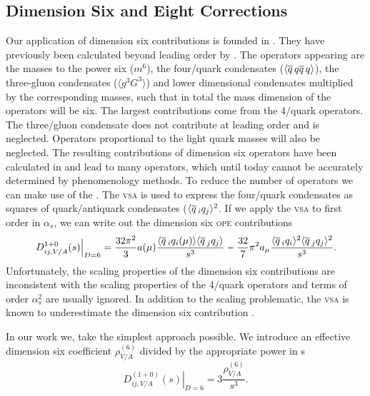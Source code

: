 \documentclass[../../index.tex]{subfiles}
\begin{document}
\subsection{Dimension Six and Eight Corrections}
Our application of dimension six contributions is founded in \cite{Braaten1991}.
They have previously been calculated beyond leading order by \cite{Lanin1986}.
The operators appearing are the masses to the power six (\(m^6\)), the
four\-/quark condensates (\(\langle \overline{q}\, q \overline{q}\, q \rangle\)), the
three-gluon condensates (\(\langle g^3 G^3 \rangle\)) and lower dimensional
condensates multiplied by the corresponding masses, such that in total the mass
dimension of the operators will be six. The largest contributions come from the
4\-/quark operators. The three\-/gluon condensate does not contribute at leading
order \cite{Hubschmid1982} and is neglected. Operators proportional to the light
quark masses will also be neglected. The resulting contributions of dimension
six operators have been calculated in \cite{Lanin1986} and lead to many
operators, which until today cannot be accurately determined by phenomenology
methods. To reduce the number of operators we can make use of the
\cite{Beneke2008,Braaten1991,Shifman1978}. The \textsc{vsa} is used to express
the four\-/quark condensates as squares of quark\-/antiquark condensates
(\(\langle \overline{q}\,_i q_j \rangle^2\). If we apply the \textsc{vsa} to first order
in \(\alpha_s\), we can write out the dimension six \textsc{ope} contributions
\begin{equation}
  \left. D_{ij,V/A}^{1+0}(s) \right\vert_{D=6} = \frac{32\pi^2}{3} a(\mu) \frac{\langle \overline{q}\,_iq_i(\mu) \rangle\langle \overline{q}\,_jq_j \rangle}{s^3}
  - \frac{32}{7} \pi^2 a_\mu \frac{\langle \overline{q}\,_i q_i \rangle^2 \langle \overline{q}\,_j q_j \rangle^2}{s^3}.
\end{equation}
Unfortunately, the scaling properties of the dimension six contributions are
inconsistent with the scaling properties of the 4\-/quark operators
\cite{Narison1983,Jamin1985} and terms of order \(\alpha_s^2\) are usually
ignored. In addition to the scaling problematic, the \textsc{vsa} is known to
underestimate the dimension six contribution \cite{Launer1983}.

In our work we, take the simplest approach possible. We introduce an effective
dimension six coefficient \(\rho_{V/A}^{(6)}\) divided by the appropriate power
in s
\begin{equation}
  \left. D_{ij,V/A}^{(1+0)}(s) \right\rvert_{D=6} = 3 \frac{\rho_{V/A}^{(6)}}{s^3}.
\end{equation}
\end{document}
